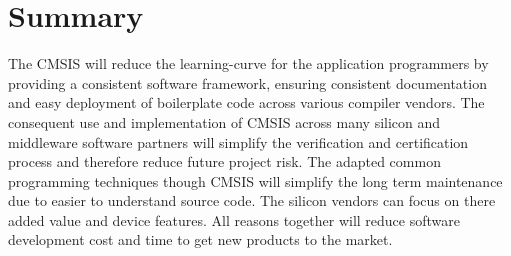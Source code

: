 \section{Summary}

The CMSIS will reduce the learning-curve for the application programmers by
providing a consistent software framework, ensuring consistent documentation and
easy deployment of boilerplate code across various compiler vendors. The
consequent use and implementation of CMSIS across many silicon and middleware
software partners will simplify the verification and certification process and
therefore reduce future project risk. The adapted common programming techniques
though CMSIS will simplify the long term maintenance due to easier to understand
source code. The silicon vendors can focus on there added value and device
features. All reasons together will reduce software development cost and time to
get new products to the market.



